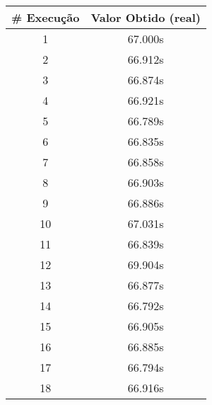 \documentclass[11pt]{article}
\begin{document}
\begin{table}[!h]
\begin{center}
\begin{minipage}{0.48\textwidth}
\begin{tabular}{| c | c |}
			\hline
				\textbf{\# Execução} &  \textbf{Valor Obtido (real)} \\ \hline
				1 & 67.000s \\ \hline
				2 & 66.912s \\ \hline
				3 & 66.874s \\ \hline
				4 & 66.921s \\ \hline
				5 & 66.789s \\ \hline
				6 & 66.835s \\ \hline
				7 & 66.858s \\ \hline
				8 & 66.903s \\ \hline
				9 & 66.886s \\ \hline
				10 & 67.031s \\ \hline
				11 & 66.839s \\ \hline
				12 & 69.904s \\ \hline
				13 & 66.877s \\ \hline
				14 & 66.792s \\ \hline
				15 & 66.905s \\ \hline
				16 & 66.885s \\ \hline
				17 & 66.794s \\ \hline
				18 & 66.916s \\ \hline
			\end{tabular}
		\end{minipage}
	\end{center}
\end{table}

\pagebreak
\end{document}
